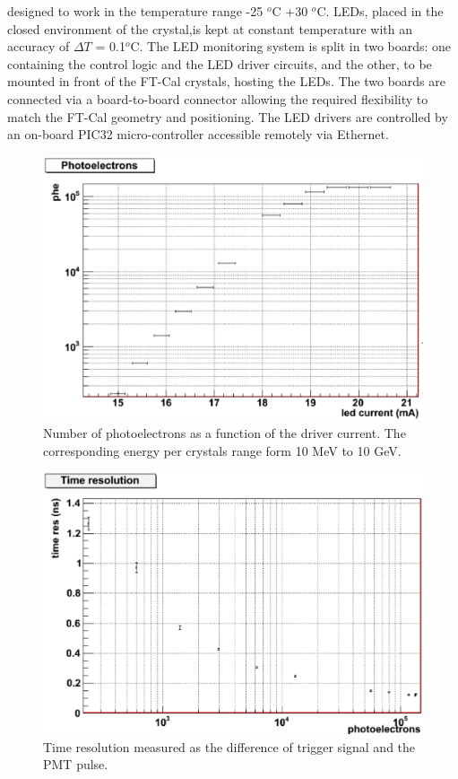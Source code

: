 designed to work in the temperature range -25 $^o$C +30 
$^o$C. LEDs, placed in the closed
environment of the crystal,is kept at
constant temperature with an accuracy of $\Delta T$ =
0.1$^o$C. The LED monitoring system is split in two
boards: one containing the control logic and
the LED driver circuits, and the other, to be
mounted in front of the FT-Cal crystals, hosting
the LEDs. The two boards are connected
via a board-to-board connector allowing the
required flexibility to match the FT-Cal geometry
and positioning. The LED drivers are controlled by an on-board PIC32 micro-controller accessible remotely  via Ethernet.
\begin{figure}[th!]
\centering 
\includegraphics[width=1.0\columnwidth]{./fig/dynamics.eps}
\caption{Number of photoelectrons as a function
of the driver current. The corresponding energy
per crystals range form 10 MeV to 10 GeV.}
\label{fig:LEDperf1} 
\end{figure}
\begin{figure}[th!]
\centering 
\includegraphics[width=1.0\columnwidth]{./fig/timing.eps}
\caption{Time resolution measured as the difference of trigger signal and the PMT pulse.}
\label{fig:LEDperf2} 
\end{figure}
